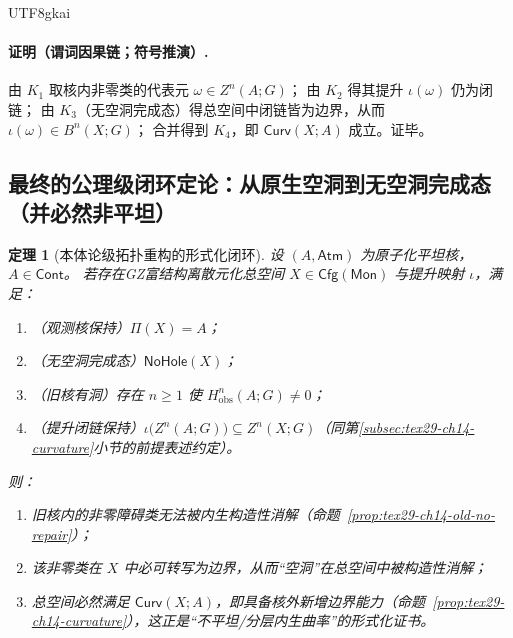 \documentclass[12pt]{article}
\newtheorem{theorem}{定理}[section]
\newcommand{\KouJing}{\texorpdfstring{表述约定}{表述约定}}
\newcommand{\GZMonization}{\texorpdfstring{GZ富结构离散元化}{GZ富结构离散元化}}
\begin{document}
\begin{CJK*}{UTF8}{gkai}
\paragraph{证明（谓词因果链；符号推演）.}
由 $K_1$ 取核内非零类的代表元 $\omega\in Z^n(A;G)$；
由 $K_2$ 得其提升 $\iota(\omega)$ 仍为闭链；
由 $K_3$（无空洞完成态）得总空间中闭链皆为边界，从而 $\iota(\omega)\in B^n(X;G)$；
合并得到 $K_4$，即 $\mathsf{Curv}(X;A)$ 成立。证毕。

\subsection{最终的公理级闭环定论：从原生空洞到无空洞完成态（并必然非平坦）}
\label{subsec:tex29-ch14-final}

\begin{theorem}[本体论级拓扑重构的形式化闭环]
\label{thm:tex29-ch14-final-loop}
设 $(A,\mathsf{Atm})$ 为原子化平坦核，$A\in\mathsf{Cont}$。
若存在\GZMonization{}总空间 $X\in\mathsf{Cfg}(\mathsf{Mon})$ 与提升映射 $\iota$，满足：
\begin{enumerate}
  \item （观测核保持）$\Pi(X)=A$；
  \item （无空洞完成态）$\mathsf{NoHole}(X)$；
  \item （旧核有洞）存在 $n\ge 1$ 使 $H^n_{\mathrm{obs}}(A;G)\neq 0$；
  \item （提升闭链保持）$\iota\bigl(Z^n(A;G)\bigr)\subseteq Z^n(X;G)$（同第\ref{subsec:tex29-ch14-curvature}小节的前提\KouJing）。
\end{enumerate}
则：
\begin{enumerate}
  \item 旧核内的非零障碍类无法被内生构造性消解（命题~\ref{prop:tex29-ch14-old-no-repair}）；
  \item 该非零类在 $X$ 中必可转写为边界，从而“空洞”在总空间中被构造性消解；
  \item 总空间必然满足 $\mathsf{Curv}(X;A)$，即具备核外新增边界能力（命题~\ref{prop:tex29-ch14-curvature}），这正是“不平坦/分层内生曲率”的形式化证书。
\end{enumerate}
\end{theorem}


\end{CJK*}
\end{document}
